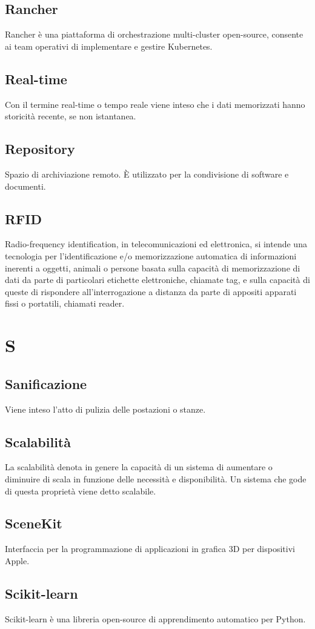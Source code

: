 \subsection{Rancher} Rancher è una piattaforma di orchestrazione multi-cluster open-source, consente ai team operativi di implementare e gestire Kubernetes.
\subsection{Real-time} Con il termine real-time o tempo reale viene inteso che i dati memorizzati hanno storicità recente, se non istantanea.
\subsection{Repository} Spazio di archiviazione remoto. È utilizzato per la condivisione di software e documenti.
\subsection{RFID} Radio-frequency identification, in telecomunicazioni ed elettronica, si intende una tecnologia per l'identificazione e/o memorizzazione automatica di informazioni inerenti a oggetti, animali o persone basata sulla capacità di memorizzazione di dati da parte di particolari etichette elettroniche, chiamate tag, e sulla capacità di queste di rispondere all'interrogazione a distanza da parte di appositi apparati fissi o portatili, chiamati reader.
\newpage \section{S}
\subsection{Sanificazione} Viene inteso l'atto di pulizia delle postazioni o stanze.
\subsection{Scalabilità} La scalabilità denota in genere la capacità di un sistema di aumentare o diminuire di scala in funzione delle necessità e disponibilità. Un sistema che gode di questa proprietà viene detto scalabile.
\subsection{SceneKit} Interfaccia per la programmazione di applicazioni in grafica 3D per dispositivi Apple.
\subsection{Scikit-learn} Scikit-learn è una libreria open-source di apprendimento automatico per Python.
